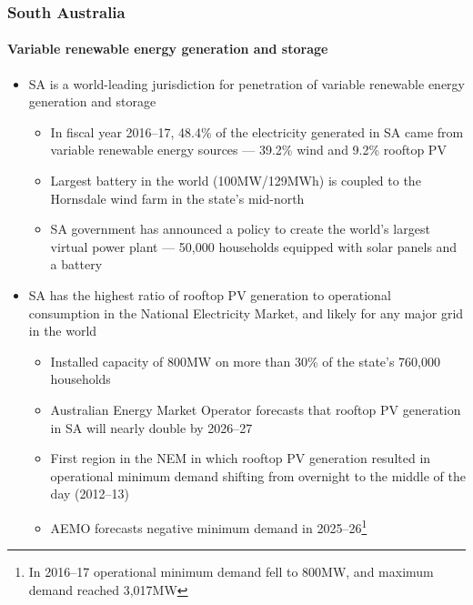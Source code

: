 \documentclass[presentation, smaller, xcolor=table]{beamer}
\begin{document}
\begin{frame}
	\frametitle{South Australia}
	\framesubtitle{Variable renewable energy generation and storage}

	\begin{itemize}
		\item  SA is a world-leading jurisdiction for penetration of variable renewable energy generation and storage
		\begin{itemize}
			\item  In fiscal year 2016--17, 48.4\% of the electricity generated in SA came from variable renewable energy sources --- 39.2\% wind and 9.2\% rooftop PV
			\item  Largest battery in the world (100MW/129MWh) is coupled to the Hornsdale wind farm in the state's mid-north
			\item  SA government has announced a policy to create the world's largest virtual power plant --- 50,000 households equipped with solar panels and a battery
		\end{itemize}
		
		\item  SA has the highest ratio of rooftop PV generation to operational consumption in the National Electricity Market, and likely for any major grid in the world
		\begin{itemize}
			\item  Installed capacity of 800MW on more than 30\% of the state's 760,000 households
			\item  Australian Energy Market Operator forecasts that rooftop PV generation in SA will nearly double by 2026--27
			\item  First region in the NEM in which rooftop PV generation resulted in operational minimum demand shifting from overnight to the middle of the day (2012--13)
			\item  AEMO forecasts negative minimum demand in 2025--26\footnote{\scriptsize In 2016--17 operational minimum demand fell to 800MW, and maximum demand reached 3,017MW
			}
		\end{itemize}
		
	\end{itemize}

\end{frame}
\end{document}
